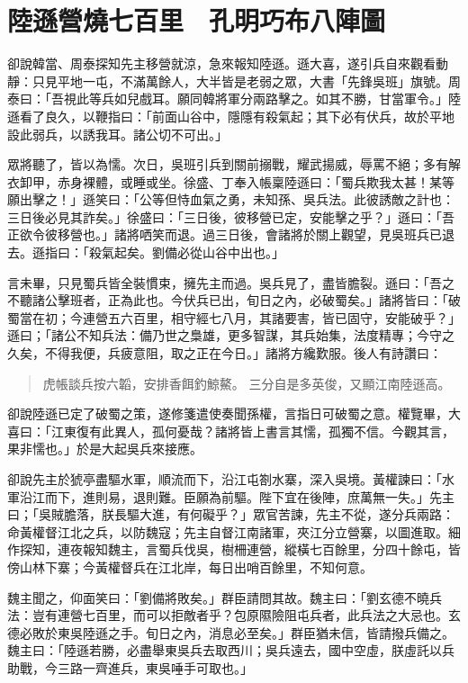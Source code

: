 
\chapter{陸遜營燒七百里　孔明巧布八陣圖}

卻說韓當、周泰探知先主移營就涼，急來報知陸遜。遜大喜，遂引兵自來觀看動靜：只見平地一屯，不滿萬餘人，大半皆是老弱之眾，大書「先鋒吳班」旗號。周泰曰：「吾視此等兵如兒戲耳。願同韓將軍分兩路擊之。如其不勝，甘當軍令。」陸遜看了良久，以鞭指曰：「前面山谷中，隱隱有殺氣起；其下必有伏兵，故於平地設此弱兵，以誘我耳。諸公切不可出。」

眾將聽了，皆以為懦。次日，吳班引兵到關前搦戰，耀武揚威，辱罵不絕；多有解衣卸甲，赤身裸體，或睡或坐。徐盛、丁奉入帳稟陸遜曰：「蜀兵欺我太甚！某等願出擊之！」遜笑曰：「公等但恃血氣之勇，未知孫、吳兵法。此彼誘敵之計也：三日後必見其詐矣。」徐盛曰：「三日後，彼移營已定，安能擊之乎？」遜曰：「吾正欲令彼移營也。」諸將哂笑而退。過三日後，會諸將於關上觀望，見吳班兵已退去。遜指曰：「殺氣起矣。劉備必從山谷中出也。」

言未畢，只見蜀兵皆全裝慣束，擁先主而過。吳兵見了，盡皆膽裂。遜曰：「吾之不聽諸公擊班者，正為此也。今伏兵已出，旬日之內，必破蜀矣。」諸將皆曰：「破蜀當在初；今連營五六百里，相守經七八月，其諸要害，皆已固守，安能破乎？」遜曰；「諸公不知兵法：備乃世之梟雄，更多智謀，其兵始集，法度精專；今守之久矣，不得我便，兵疲意阻，取之正在今日。」諸將方纔歎服。後人有詩讚曰：

\begin{quote}
虎帳談兵按六韜，安排香餌釣鯨鰲。
三分自是多英俊，又顯江南陸遜高。
\end{quote}

卻說陸遜已定了破蜀之策，遂修箋遣使奏聞孫權，言指日可破蜀之意。權覽畢，大喜曰：「江東復有此異人，孤何憂哉？諸將皆上書言其懦，孤獨不信。今觀其言，果非懦也。」於是大起吳兵來接應。

卻說先主於猇亭盡驅水軍，順流而下，沿江屯劄水寨，深入吳境。黃權諫曰：「水軍沿江而下，進則易，退則難。臣願為前驅。陛下宜在後陣，庶萬無一失。」先主曰；「吳賊膽落，朕長驅大進，有何礙乎？」眾官苦諫，先主不從，遂分兵兩路：命黃權督江北之兵，以防魏寇；先主自督江南諸軍，夾江分立營寨，以圖進取。細作探知，連夜報知魏主，言蜀兵伐吳，樹柵連營，縱橫七百餘里，分四十餘屯，皆傍山林下寨；今黃權督兵在江北岸，每日出哨百餘里，不知何意。

魏主聞之，仰面笑曰：「劉備將敗矣。」群臣請問其故。魏主曰：「劉玄德不曉兵法：豈有連營七百里，而可以拒敵者乎？包原隰險阻屯兵者，此兵法之大忌也。玄德必敗於東吳陸遜之手。旬日之內，消息必至矣。」群臣猶未信，皆請撥兵備之。魏主曰：「陸遜若勝，必盡舉東吳兵去取西川；吳兵遠去，國中空虛，朕虛託以兵助戰，今三路一齊進兵，東吳唾手可取也。」

